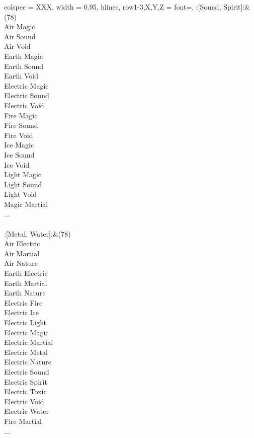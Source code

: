 \begin{longtblr}[
	caption = {2v2 Defending Weak},
	label = {2v2-Defending-Weak},
]{
	colspec = {XXX}, width = 0.95\linewidth,
	hlines,
	row{1-3,X,Y,Z} = {font=\bfseries},
}
	:[Sound, Spirit]:&{(78)\\
	Air Magic \\
	Air Sound \\
	Air Void \\
	Earth Magic \\
	Earth Sound \\
	Earth Void \\
	Electric Magic \\
	Electric Sound \\
	Electric Void \\
	Fire Magic \\
	Fire Sound \\
	Fire Void \\
	Ice Magic \\
	Ice Sound \\
	Ice Void \\
	Light Magic \\
	Light Sound \\
	Light Void \\
	Magic Martial \\
	...\\
	}\\

	:[Metal, Water]:&{(78)\\
	Air Electric \\
	Air Martial \\
	Air Nature \\
	Earth Electric \\
	Earth Martial \\
	Earth Nature \\
	Electric Fire \\
	Electric Ice \\
	Electric Light \\
	Electric Magic \\
	Electric Martial \\
	Electric Metal \\
	Electric Nature \\
	Electric Sound \\
	Electric Spirit \\
	Electric Toxic \\
	Electric Void \\
	Electric Water \\
	Fire Martial \\
	...\\
	}\\


\end{longtblr}
